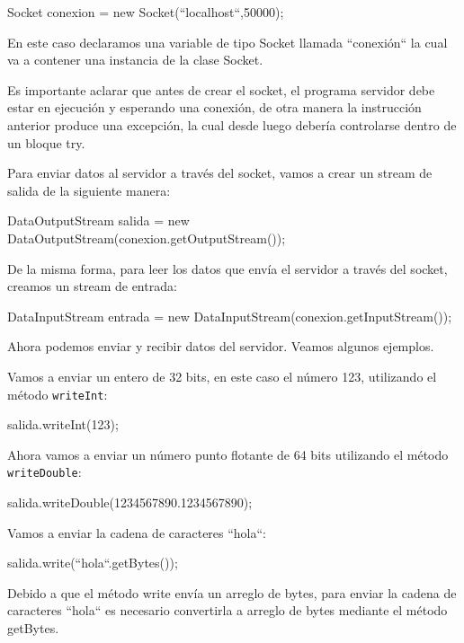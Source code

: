 \documentclass[11pt,a4paper,oneside]{book}
\begin{document}
Socket conexion = new Socket(``localhost``,50000);

En este caso declaramos una variable de tipo Socket llamada ``conexión`` la cual va a contener una instancia de la clase Socket.

Es importante aclarar que antes de crear el socket, el programa servidor debe estar en ejecución y esperando una conexión, de otra manera la instrucción anterior produce una excepción, la cual desde luego debería controlarse dentro de un bloque try.

Para enviar datos al servidor a través del socket, vamos a crear un stream de salida de la siguiente manera:

\begin{SourceCode}
DataOutputStream salida = new DataOutputStream(conexion.getOutputStream());
\end{SourceCode}

De la misma forma, para leer los datos que envía el servidor a través del socket, creamos un stream de entrada:

\begin{SourceCode}
DataInputStream entrada = new DataInputStream(conexion.getInputStream());
\end{SourceCode}

Ahora podemos enviar y recibir datos del servidor. Veamos algunos ejemplos.

Vamos a enviar un entero de 32 bits, en este caso el número 123, utilizando el método \texttt{writeInt}:

\begin{SourceCode}
salida.writeInt(123);
\end{SourceCode}

Ahora vamos a enviar un número punto flotante de 64 bits utilizando el método \texttt{writeDouble}:

\begin{SourceCode}
salida.writeDouble(1234567890.1234567890);
\end{SourceCode}

Vamos a enviar la cadena de caracteres ``hola``:

\begin{SourceCode}
salida.write(``hola``.getBytes());
\end{SourceCode}

Debido a que el método write envía un arreglo de bytes, para enviar la cadena de caracteres ``hola`` es necesario convertirla a arreglo de bytes mediante el método getBytes.
\end{document}
